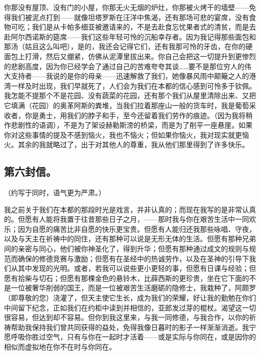 你那没有屋顶、没有门的小屋，你那无火无烟的炉灶，你那被火烤干的墙壁——免得我们被泥点打到——就像坦塔罗斯在汪洋中焦渴，还有那场可悲的宴席，没有食物可吃；我们是从卡帕多细亚被邀请来的，不是去赴食忘忧果者式的清贫，而是去赴阿尔西诺斯的筵席——我们这些年轻可怜的沉船幸存者。因为我记得那些面包和那汤（姑且这么叫吧），是的，我还会记得它们，还有我那可怜的牙齿，在你的硬面包上打滑，然后又绷紧，仿佛从泥潭里拔出来。你自己会把这一切提升到更惨烈的悲剧高度，因为你已经学会了通过自己的苦难夸夸其谈……要不是那位穷人的伟大支持者——我说的是你的母亲——迅速解救了我们，她像暴风雨中颠簸之人的港湾一样及时出现，我们早就死了，人们会为我们在本都的信心感到可怜多于钦佩。我怎能不提那个不是花园、没有蔬菜的花园，还有那个我们从屋里清除出来、又把它填满（花园）的奥革阿斯的粪堆，当我们拉着那座山一般的货车时，我是葡萄采收者，你是勇士，用我们的脖子和手，至今还留着我们劳作的痕迹。（因为我将稍作悲剧性的语调），不是为了架设赫勒斯滂的桥梁，而是为了削平一座悬崖。如果你对这些事情的提及不感到恼火，我也不恼火；但如果你恼火，我对现实就更恼火。其余的我就略过了，出于对其他人的尊重，我从他们那里得到了许多快乐。\par


\subsection{第六封信。}

（约写于同时，语气更为严肃。）\par

我之前关于我们在本都的那段时光是戏言，并非认真的；而现在我写的是非常认真的。但愿有人能将我置于往昔那些日子之月，——那时我与你在艰苦生活中一同欢乐；因为自愿的痛苦比非自愿的快乐更宝贵。但愿有人能归还我那些咏唱、守夜，以及与天主在祈祷中的同住，还有那种可以说是无形无体的生活。但愿有那种兄弟间的亲密与同心，他们被你神圣化了，得到升华；但愿有那种通过成文的规则与规范而确保的修德竞赛与激励；但愿有在圣经中的热诚劳作，以及在圣神的引导下我们从其中发现的光明。或者，若我可以说些更小更轻的事，但愿有日课与经验；但愿有拾柴与切石；但愿有那棵金色的悬铃木，比薛西斯的更珍贵，坐在它下面的不是一位被奢华削弱的国王，而是一位被艰苦生活磨砺的隐修士，我栽种了，阿颇罗（即尊敬的您）浇灌了，但天主使它生长，成为我们的荣耀，好让我的勤勉在你们中间留下纪念，正如我们在约柜中读到并相信的，亚郎发过芽的棍杖。渴望这一切很容易，但达到却不容易。但你到我这里来，与我一同修德，与我合作，以你的祈祷帮助我保持我们曾共同获得的益处，免得我像日暮时的影子一样渐渐消逝。我宁愿呼吸你胜过空气，只有与你在一起时才活着——或是实际与你同在，或是因你的相似而虚拟地在你不在时与你同在。\par

